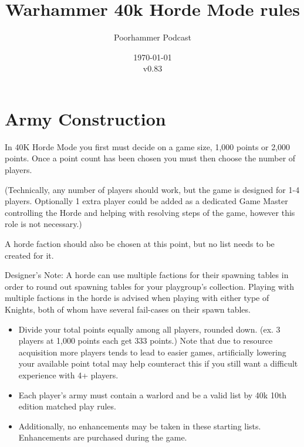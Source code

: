 \documentclass{HordeModeTarot}
\title{Warhammer 40k Horde Mode rules}
\author{Poorhammer Podcast}
\date{\today \\v0.83}
\begin{document}
\maketitle

\section{Army Construction}
In 40K Horde Mode you first must decide on a game size, 1,000 points or 2,000 points.  Once a point count has been chosen you must then choose the number of players.

(Technically, any number of players should work, but the game is designed for 1-4 players. Optionally 1 extra player could be added as a dedicated Game Master controlling the Horde and helping with resolving steps of the game, however this role is not necessary.)

A horde faction should also be chosen at this point, but no list needs to be created for it.  

Designer’s Note: A horde can use multiple factions for their spawning tables in order to round out spawning tables for your playgroup’s collection. Playing with multiple factions in the horde is advised when playing with either type of Knights, both of whom have several fail-cases on their spawn tables.

\begin{itemize}
\item Divide your total points equally among all players, rounded down. (ex. 3 players at 1,000 points each get 333 points.)  
Note that due to resource acquisition more players tends to lead to easier games, artificially lowering your available point total may help counteract this if you still want a difficult experience with 4+ players.
\item Each player’s army must contain a warlord and be a valid list by 40k 10th edition matched play rules.
\item Additionally, no enhancements may be taken in these starting lists. Enhancements are purchased during the game.
\end{itemize}
\end{document}
